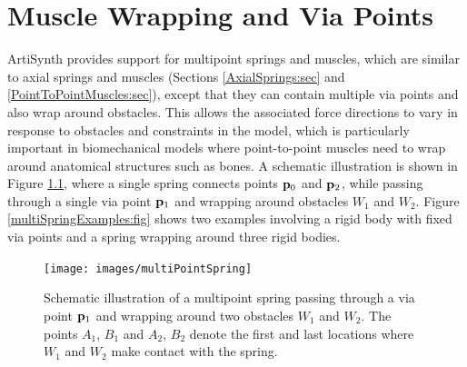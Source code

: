 
\chapter{Muscle Wrapping and Via Points}
\label{multipointSpringIntro:sec}

ArtiSynth provides support for multipoint springs and muscles, which
are similar to axial springs and muscles (Sections
\ref{AxialSprings:sec} and \ref{PointToPointMuscles:sec}), except that
they can contain multiple via points and also wrap around obstacles.
This allows the associated force directions to vary in response to
obstacles and constraints in the model, which is particularly
important in biomechanical models where point-to-point muscles need to
wrap around anatomical structures such as bones.  A schematic
illustration is shown in Figure \ref{multiPointSpring:fig}, where a
single spring connects points ${\bf p}_0$ and ${\bf p}_2$, while passing through
a single via point ${\bf p}_1$ and wrapping around obstacles $W_1$ and
$W_2$. Figure \ref{multiSpringExamples:fig} shows two examples
involving a rigid body with fixed via points and a spring wrapping
around three rigid bodies.

\begin{figure}[ht]
\begin{center}
 \texttt{[image: images/multiPointSpring]}
\end{center}
\caption{Schematic illustration of a multipoint spring passing through
a via point ${\bf p}_1$ and wrapping around two obstacles $W_1$ and
$W_2$. The points $A_1$, $B_1$ and $A_2$, $B_2$ denote the first and
last locations where $W_1$ and $W_2$ make contact with the spring.}
\label{multiPointSpring:fig}
\end{figure}


